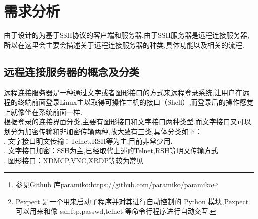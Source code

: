 \documentclass[UTF8,a4paper,cs4size]{ctexart}
\begin{document}

\CTEXoptions[abstractname={\zihao{3} 摘要}]

\begin{abstract}
传统的网络服务程序,如rsh,FTP,POP 和Telnet 其本质上都是不安全的；因为它们在网络上用明文传送数据,用户帐号和用户口令,很容易受到中间人MITM（man-in-the-middle）攻击方式的攻击.就是存在另一个人或者一台机器冒充真正的服务器接收用户传给服务器的数据,然后再冒充用户把数据传给真正的服务器.而SSH 可以对所有传输的数据进行加密,也能够防止DNS 欺骗和IP 欺骗.所以最常用的方式就是利用SSH（安全外壳）来发送流量,但是对于大部分（约99.81943\%）的Windows 主机来说,不存在SSH 客户端.在这里会利用网络编程中的套接字编程结合Paramiko\footnote{参见Github 库paramiko:https://github.com/paramiko/paramiko}库开发SSH 应用程序.\\
\indent Paramiko是基于Python实现的SSH2远程安全连接,支持认证及密钥方式.可以实现远程命令执行,文件传输,中间SSH代理等功能,相对于Pexpect\footnote{Pexpect 是一个用来启动子程序并对其进行自动控制的 Python 模块,Pexpect可以用来和像 ssh,ftp,passwd,telnet 等命令行程序进行自动交互.},封装的层次更高,该类封装了传输,通道等等方法,使其更贴近SSH协议的功能.因此由于封装了SSH2协议更高层次的功能,本篇论文会将阐述基于Paramiko的SSH客户端和服务器设计和具体实现,目的是通过抽象的代码封装来认识SSH
协议通信流程和通信过程中的关键要点.\\
\indent 关键字：SSH; 中间人攻击; python语言实现
\end{abstract}


\newpage

\CTEXoptions[contentsname={\zihao{3}目\ 录}]
\tableofcontents


\newpage

\section{需求分析}
由于设计的为基于SSH协议的客户端和服务器,由于SSH服务器是远程连接服务器,所以在这里会主要会描述关于远程连接服务器的种类,具体功能以及相关的流程.
\subsection{远程连接服务器的概念及分类}
远程连接服务器是一种通过文字或者图形接口的方式来远程登录系统,让用户在远程的终端前面登录Linux主以取得可操作主机的接口（Shell）,而登录后的操作感觉上就像坐在系统前面一样.\\
\indent 根据登录的连接界面分类,主要有图形接口和文字接口两种类型.而文字接口又可以划分为加密传输和非加密传输两种,故大致有三类,具体分类如下：\\
. 文字接口明文传输：Telnet,RSH等为主,目前非常少用.\\
. 文字接口加密：SSH为主,已经取代上述的Telnet,RSH等明文传输方式\\
. 图形接口：XDMCP,VNC,XRDP等较为常见
\end{document}
